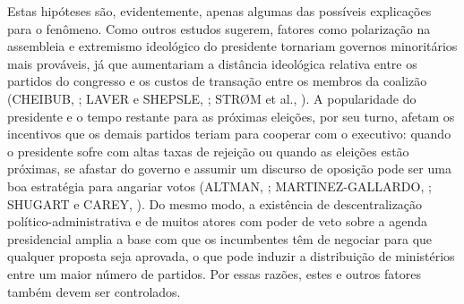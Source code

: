 Estas hipóteses são, evidentemente, apenas algumas das possíveis explicações para o fenômeno. Como outros estudos sugerem, fatores como polarização na assembleia e extremismo ideológico do presidente tornariam governos minoritários mais prováveis, já que aumentariam a distância ideológica relativa entre os partidos do congresso e os custos de transação entre os membros da coalizão (CHEIBUB, \citeyear{cheibub2007}; LAVER e SHEPSLE, \citeyear{laver1996}; STR\O{}M et al., \citeyear{strom2010}). A popularidade do presidente e o tempo restante para as próximas eleições, por seu turno, afetam os incentivos que os demais partidos teriam para cooperar com o executivo: quando o presidente sofre com altas taxas de rejeição ou quando as eleições estão próximas, se afastar do governo e assumir um discurso de oposição pode ser uma boa estratégia para angariar votos (ALTMAN, \citeyear{altman2000}; MARTINEZ-GALLARDO, \citeyear{martinez2012}; SHUGART e CAREY, \citeyear{shugart1992}). Do mesmo modo, a existência de descentralização político-administrativa e de muitos atores com poder de veto sobre a agenda presidencial amplia a base com que os incumbentes têm de negociar para que qualquer proposta seja aprovada, o que pode induzir a distribuição de ministérios entre um maior número de partidos. Por essas razões, estes e outros fatores também devem ser controlados. 

